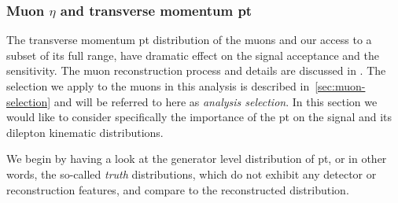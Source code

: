 \subsubsection{Muon $\eta$ and transverse momentum \gls{pt}}
\label{sec:muon-eta-pt}

The transverse momentum \gls{pt} distribution of the muons and our access to a subset of its full range, have dramatic effect on the signal acceptance and the sensitivity. The muon reconstruction process and details are discussed in . The selection we apply to the muons in this analysis is described in~\ref{sec:muon-selection} and will be referred to here as \emph{analysis selection}. In this section we would like to consider specifically the importance of the \gls{pt} on the signal and its dilepton kinematic distributions.

We begin by having a look at the generator level distribution of \gls{pt}, or in other words, the so-called \emph{truth} distributions, which do not exhibit any detector or reconstruction features, and compare to the reconstructed distribution.

